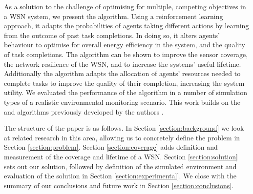 As a solution to the challenge of optimising for multiple, competing objectives in a WSN system, we present the \acronymWSNOptimisationExtended{}{} algorithm. Using a reinforcement learning approach, it adapts the probabilities of agents taking different actions by learning from the outcome of past task completions. In doing so, it alters agents' behaviour to optimise for overall energy efficiency in the system, and the quality of task completions. The algorithm can be shown to improve the sensor coverage, the network resilience of the WSN, and to increase the systems' useful lifetime. Additionally the algorithm adapts the allocation of agents' resources needed to complete tasks to improve the quality of their completion, increasing the system utility.  We evaluated the performance of the  algorithm in a number of simulation types of a realistic environmental monitoring scenario. This work builds on the  \acronymATARIA{}{} and \acronymMGRAO{}{} algorithms previously developed by the authors  \citep{creech2021dynamic, creech2021resource}. 

The structure of the paper is as follows. In Section \ref{section:background} we look at related research in this area, allowing us to concretely define the problem in Section \ref{section:problem}. Section \ref{section:coverage} adds definition and measurement of the coverage and lifetime of a WSN. Section \ref{section:solution} sets out our solution, followed by definition of the simulated environment and evaluation of the solution in Section \ref{section:experimental}. We close with the summary of our conclusions and future work in Section \ref{section:conclusions}.
